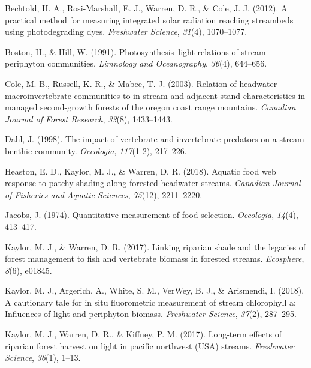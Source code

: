 \documentclass[double,12pt]{beavtex}
\begin{document}
  \setlength{\parindent}{-0.2in} \setlength{\leftskip}{0.2in}
  \setlength{\parskip}{8pt} \noindent
  
  \hypertarget{refs}{}
  \hypertarget{ref-Bechtold2012}{}
  Bechtold, H. A., Rosi-Marshall, E. J., Warren, D. R., \& Cole, J. J.
  (2012). A practical method for measuring integrated solar radiation
  reaching streambeds using photodegrading dyes. \emph{Freshwater
  Science}, \emph{31}(4), 1070--1077.
  
  \hypertarget{ref-Boston1991}{}
  Boston, H., \& Hill, W. (1991). Photosynthesis--light relations of
  stream periphyton communities. \emph{Limnology and Oceanography},
  \emph{36}(4), 644--656.
  
  \hypertarget{ref-Cole2003}{}
  Cole, M. B., Russell, K. R., \& Mabee, T. J. (2003). Relation of
  headwater macroinvertebrate communities to in-stream and adjacent stand
  characteristics in managed second-growth forests of the oregon coast
  range mountains. \emph{Canadian Journal of Forest Research},
  \emph{33}(8), 1433--1443.
  
  \hypertarget{ref-Dahl1998}{}
  Dahl, J. (1998). The impact of vertebrate and invertebrate predators on
  a stream benthic community. \emph{Oecologia}, \emph{117}(1-2), 217--226.
  
  \hypertarget{ref-Heaston2018}{}
  Heaston, E. D., Kaylor, M. J., \& Warren, D. R. (2018). Aquatic food web
  response to patchy shading along forested headwater streams.
  \emph{Canadian Journal of Fisheries and Aquatic Sciences},
  \emph{75}(12), 2211--2220.
  
  \hypertarget{ref-Jacobs1974}{}
  Jacobs, J. (1974). Quantitative measurement of food selection.
  \emph{Oecologia}, \emph{14}(4), 413--417.
  
  \hypertarget{ref-Kaylor2017Eco}{}
  Kaylor, M. J., \& Warren, D. R. (2017). Linking riparian shade and the
  legacies of forest management to fish and vertebrate biomass in forested
  streams. \emph{Ecosphere}, \emph{8}(6), e01845.
  
  \hypertarget{ref-Kaylor2018}{}
  Kaylor, M. J., Argerich, A., White, S. M., VerWey, B. J., \& Arismendi,
  I. (2018). A cautionary tale for in situ fluorometric measurement of
  stream chlorophyll a: Influences of light and periphyton biomass.
  \emph{Freshwater Science}, \emph{37}(2), 287--295.
  
  \hypertarget{ref-Kaylor2017FS}{}
  Kaylor, M. J., Warren, D. R., \& Kiffney, P. M. (2017). Long-term
  effects of riparian forest harvest on light in pacific northwest (USA)
  streams. \emph{Freshwater Science}, \emph{36}(1), 1--13.
  
\end{document}

